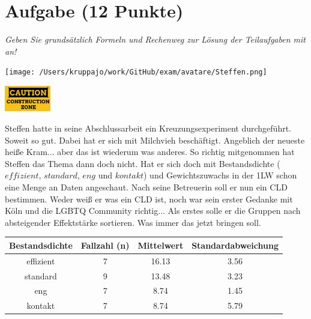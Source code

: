 \documentclass[a4paper, 9pt]{scrartcl}\usepackage[]{graphicx}\usepackage[]{xcolor}
\newenvironment{knitrout}{}{} %
\begin{document}
 
\clearpage

\section{Aufgabe \hfill (12 Punkte)}

\textit{Geben Sie grundsätzlich Formeln und Rechenweg zur Lösung der Teilaufgaben mit an!} \\[1Ex]
 

 
\begin{minipage}[t]{0.5\textwidth}
\texttt{[image: /Users/kruppajo/work/GitHub/exam/avatare/Steffen.png]}
\end{minipage}
\begin{minipage}[t]{0.5\textwidth}
\hfill
\href{https://youtu.be/RagTFFKFbFg}{\includegraphics[width = 2cm]{img/caution}}
\end{minipage}
\vspace{1ex}



Steffen hatte in seine Abschlussarbeit ein Kreuzungsexperiment durchgeführt. Soweit so gut. Dabei hat er sich mit Milchvieh beschäftigt. Angeblich der neueste heiße Kram... aber das ist wiederum was anderes. So richtig mitgenommen hat Steffen das Thema dann doch nicht. Hat er sich doch mit Bestandsdichte ($effizient$, $standard$, $eng$ und $kontakt$) und Gewichtszuwachs in der 1LW schon eine Menge an Daten angeschaut. Nach seine Betreuerin soll er nun ein CLD bestimmen. Weder weiß er was ein CLD ist, noch war sein erster Gedanke mit Köln und die LGBTQ Community richtig... Als erstes solle er die Gruppen nach absteigender Effektstärke sortieren. Was immer das jetzt bringen soll.

\begin{knitrout}
\color{fgcolor}\begin{table}[!h]
\centering\begingroup\fontsize{10}{12}\selectfont

\begin{tabular}{cccc}
\toprule
\textbf{Bestandsdichte} & \textbf{Fallzahl (n)} & \textbf{Mittelwert} & \textbf{Standardabweichung}\\
\midrule
effizient & 7 & 16.13 & 3.56\\
standard & 9 & 13.48 & 3.23\\
eng & 7 & 8.74 & 1.45\\
kontakt & 7 & 8.74 & 5.79\\
\bottomrule
\end{tabular}
\endgroup{}
\end{table}

\end{knitrout}
\end{document}
